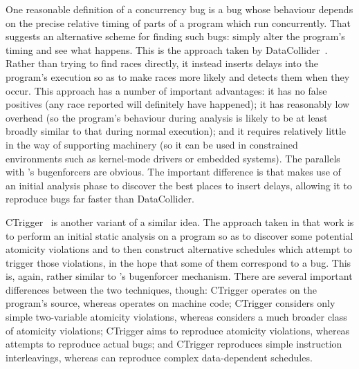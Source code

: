One reasonable definition of a concurrency bug is a bug whose
behaviour depends on the precise relative timing of parts of a program
which run concurrently.  That suggests an alternative scheme for
finding such bugs: simply alter the program's timing and see what
happens.  This is the approach taken by
DataCollider~\cite{Erickson2010}.  Rather than trying to find races
directly, it instead inserts delays into the program's execution so as
to make races more likely and detects them when they occur.  This
approach has a number of important advantages: it has no false
positives (any race reported will definitely have happened); it has
reasonably low overhead (so the program's behaviour during analysis is
likely to be at least broadly similar to that during normal
execution); and it requires relatively little in the way of supporting
machinery (so it can be used in constrained environments such as
kernel-mode drivers or embedded systems).  The parallels with
{\technique}'s \glspl{bugenforcer} are obvious.  The important
difference is that {\technique} makes use of an initial analysis phase
to discover the best places to insert delays, allowing it to reproduce
bugs far faster than DataCollider.

CTrigger~\cite{Zhou} is another variant of a similar idea.  The
approach taken in that work is to perform an initial static analysis
on a program so as to discover some potential atomicity violations and
to then construct alternative schedules which attempt to trigger those
violations, in the hope that some of them correspond to a bug.  This
is, again, rather similar to {\technique}'s \gls{bugenforcer}
mechanism.  There are several important differences between the two
techniques, though: CTrigger operates on the program's source, whereas
{\technique} operates on machine code; CTrigger considers only simple
two-variable atomicity violations, whereas {\technique} considers a
much broader class of atomicity violations; CTrigger aims to reproduce
atomicity violations, whereas {\technique} attempts to reproduce
actual bugs; and CTrigger reproduces simple instruction interleavings,
whereas {\technique} can reproduce complex data-dependent schedules.

